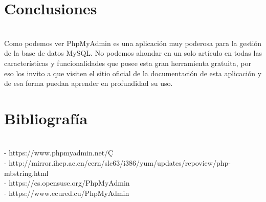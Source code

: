 
\section{Conclusiones} 
\begin{itemize} 
\\Como podemos ver PhpMyAdmin es una aplicación muy poderosa para la gestión de la base de datos MySQL. No podemos ahondar en un solo artículo en todas las características y funcionalidades que posee esta gran herramienta gratuita, por eso los invito a que visiten el sitio oficial de la documentación de esta aplicación y de esa forma puedan aprender en profundidad su uso.
\\
\end{itemize} 

\section{Bibliografía} 
\begin{itemize}
\\- https://www.phpmyadmin.net/Ç
\\- http://mirror.ihep.ac.cn/cern/slc63/i386/yum/updates/repoview/php-mbstring.html
\\- https://es.opensuse.org/PhpMyAdmin
\\- https://www.ecured.cu/PhpMyAdmin

\end{itemize}

\\
